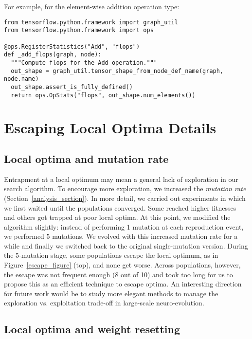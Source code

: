 \documentclass{article}
\begin{document}
For example, for the element-wise addition operation type:

\smallskip
\begin{lstlisting}
from tensorflow.python.framework import graph_util
from tensorflow.python.framework import ops
 
@ops.RegisterStatistics("Add", "flops")
def _add_flops(graph, node):
  """Compute flops for the Add operation."""
  out_shape = graph_util.tensor_shape_from_node_def_name(graph, node.name)
  out_shape.assert_is_fully_defined()
  return ops.OpStats("flops", out_shape.num_elements())

\end{lstlisting}


\section{Escaping Local Optima Details}


\label{escaping_local_optima_supplementary_section}

\subsection{Local optima and mutation rate}

Entrapment at a local optimum may mean a general lack of exploration in our search algorithm. To encourage more exploration, we increased the {\em mutation rate} (Section~\ref{analysis_section}). In more detail, we carried out experiments in which we first waited until the populations converged. Some reached higher fitnesses and others got trapped at poor local optima. At this point, we modified the algorithm slightly: instead of performing 1 mutation at each reproduction event, we performed 5 mutations. We evolved with this increased mutation rate for a while and finally we switched back to the original single-mutation version. During the 5-mutation stage, some populations escape the local optimum, as in Figure~\ref{escape_figure} (top), and none get worse. Across populations, however, the escape was not frequent enough (8 out of 10) and took too long for us to propose this as an efficient technique to escape optima. An interesting direction for future work would be to study more elegant methods to manage the exploration vs. exploitation trade-off in large-scale neuro-evolution.

\subsection{Local optima and weight resetting}
\end{document}
